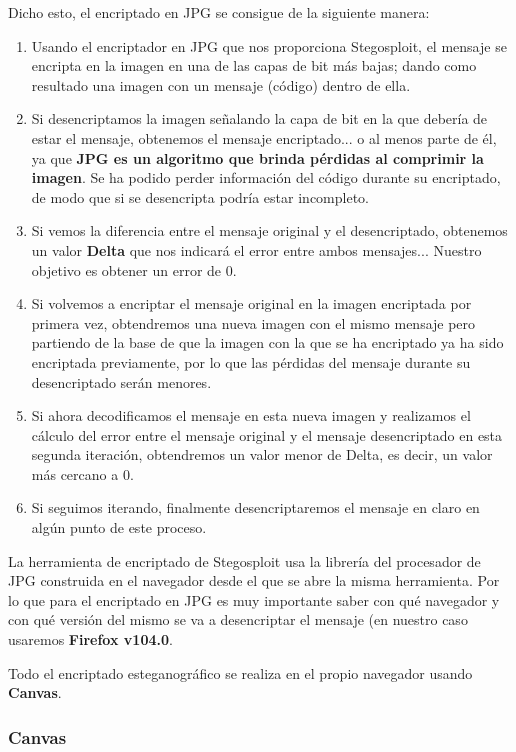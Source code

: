 Dicho esto, el encriptado en JPG se consigue de la siguiente manera:

\begin{enumerate}
\item Usando el encriptador en JPG que nos proporciona Stegosploit, el mensaje se encripta en la imagen en una de las capas de bit más bajas; dando como resultado una imagen con un mensaje (código) dentro de ella.
\item Si desencriptamos la imagen señalando la capa de bit en la que debería de estar el mensaje, obtenemos el mensaje encriptado... o al menos parte de él, ya que \textbf{JPG es un algoritmo que brinda pérdidas al comprimir la imagen}. Se ha podido perder información del código durante su encriptado, de modo que si se desencripta podría estar incompleto.
\item Si vemos la diferencia entre el mensaje original y el desencriptado, obtenemos un valor \textbf{Delta} que nos indicará el error entre ambos mensajes... Nuestro objetivo es obtener un error de 0.
\item Si volvemos a encriptar el mensaje original en la imagen encriptada por primera vez, obtendremos una nueva imagen con el mismo mensaje pero partiendo de la base de que la imagen con la que se ha encriptado ya ha sido encriptada previamente, por lo que las pérdidas del mensaje durante su desencriptado serán menores.
\item Si ahora decodificamos el mensaje en esta nueva imagen y realizamos el cálculo del error entre el mensaje original y el mensaje desencriptado en esta segunda iteración, obtendremos un valor menor de Delta, es decir, un valor más cercano a 0.
\item Si seguimos iterando, finalmente desencriptaremos el mensaje en claro en algún punto de este proceso.
\end{enumerate}

La herramienta de encriptado de Stegosploit usa la librería del procesador de JPG construida en el navegador desde el que se abre la misma herramienta. Por lo que para el encriptado en JPG es muy importante saber con qué navegador y con qué versión del mismo se va a desencriptar el mensaje (en nuestro caso usaremos \textbf{Firefox v104.0}.

Todo el encriptado esteganográfico se realiza en el propio navegador usando \textbf{Canvas}. %

\subsubsection{Canvas}

